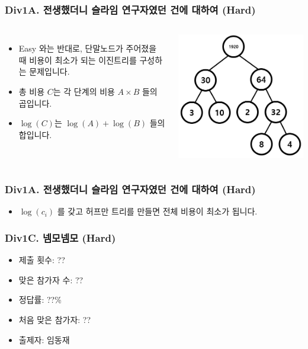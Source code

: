 \documentclass[xetex]{beamer}
\begin{document}
\begin{frame}
  \frametitle{Div1A. 전생했더니 슬라임 연구자였던 건에 대하여 (Hard)}
  \begin{columns}
      \begin{itemize}
        \item Easy 와는 반대로, 단말노드가 주어졌을 때 비용이 최소가 되는 이진트리를 구성하는 문제입니다.
        \item 총 비용 $C$는 각 단계의 비용 $A \times B$ 들의 곱입니다.
        \item $\log(C)$는 $\log(A) + \log(B)$ 들의 합입니다.
      \end{itemize}
      \includegraphics[width=1\textwidth]{slime2-sol-0.png}
  \end{columns}
\end{frame}

\begin{frame}
  \frametitle{Div1A. 전생했더니 슬라임 연구자였던 건에 대하여 (Hard)}
  \begin{itemize}
    \item $\log(c_i)$ 를 갖고 허프만 트리를 만들면 전체 비용이 최소가 됩니다.
  \end{itemize}
\end{frame}

\begin{frame}
  \frametitle{Div1C. 넴모넴모 (Hard)}
  \begin{itemize}
    \item 제출 횟수: ??
    \item 맞은 참가자 수: ??
    \item 정답률: ??\%
    \item 처음 맞은 참가자: ??
    \item 출제자: 임동재
  \end{itemize}
\end{frame}
\end{document}

